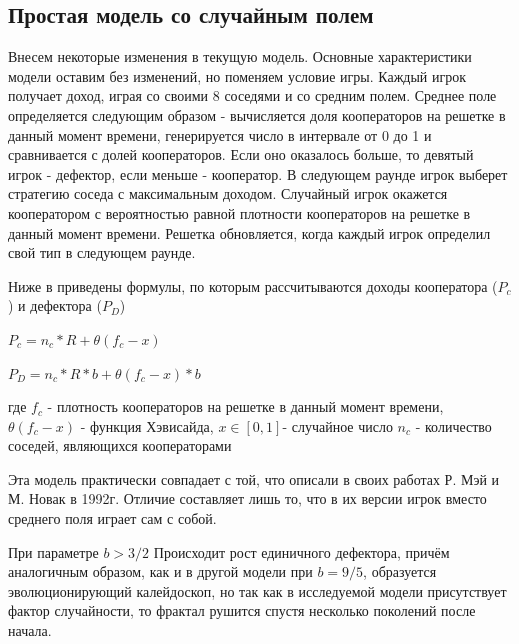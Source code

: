 \documentclass[a4paper]{article}
\begin{document}
	
	\subsection{Простая модель со случайным полем}
	
	\par Внесем некоторые изменения в текущую модель. Основные характеристики модели
	оставим без изменений, но поменяем условие игры. Каждый игрок получает доход, играя со своими 8 соседями и со средним полем. Среднее поле определяется следующим образом - вычисляется доля кооператоров на решетке в данный момент времени, генерируется число в интервале от 0 до 1 и сравнивается с долей кооператоров. Если оно оказалось больше, то девятый игрок - дефектор, если меньше - кооператор. В следующем раунде игрок выберет стратегию соседа с максимальным доходом. Случайный игрок окажется кооператором с вероятностью равной плотности кооператоров на решетке в данный момент времени. Решетка 
	обновляется, когда каждый игрок определил свой тип в следующем раунде.
	
	\par Ниже в приведены формулы, по которым рассчитываются доходы кооператора ($P_{c}$) и дефектора ($P_{D}$)
	
	$ P_{c}= n_{c}*R+ \theta(f_{c}-x) $
	
	$ P_{D}= n_{c}*R*b+ \theta(f_{c}-x)*b $
	
	где $ f_{c}$ - плотность кооператоров на решетке в данный момент
	времени, $\theta(f_{c}-x)$ - функция Хэвисайда, $x \in [0,1]$- случайное число
	$n_{c}$ - количество соседей, являющихся кооператорами
	 
	
	\par Эта модель практически совпадает с той, что описали в своих работах Р. Мэй и
	М. Новак в 1992г. Отличие составляет лишь то, что в их версии игрок вместо среднего поля играет сам с собой.
	
	\par При параметре $b>3/2$ Происходит рост единичного дефектора, причём аналогичным образом, как и в другой модели при $b=9/5$, образуется эволюционирующий калейдоскоп, но так как в исследуемой модели присутствует фактор случайности, то фрактал рушится спустя несколько поколений после начала.
	
	
	
\end{document}
